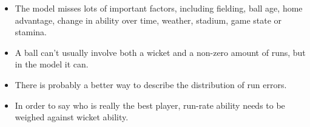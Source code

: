 \documentclass[11pt]{article}
\begin{document}
\begin{itemize}
\item The model misses lots of important factors, including fielding, ball age,
home advantage, change in ability over time, weather, stadium, game
state or stamina.
\item A ball can't usually involve both a wicket and a non-zero amount of
runs, but in the model it can.
\item There is probably a better way to describe the distribution of run
errors.
\item In order to say who is really the best player, run-rate ability
needs to be weighed against wicket ability.
\end{itemize}
\end{document}
